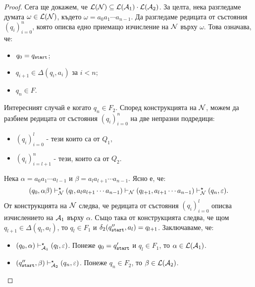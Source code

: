 \begin{proof}
  Сега ще докажем, че $\mathcal{L}(\mathcal{N}) \subseteq \mathcal{L}(\mathcal{A}_1) \cdot \mathcal{L}(\mathcal{A}_2)$.
  За целта, нека разгледаме думата $\omega \in \mathcal{L}(\mathcal{N})$, където $\omega = a_0a_1\cdots a_{n-1}$.
  Да разгледаме редицата от състояния $(q_i)^{n}_{i=0}$, която описва едно приемащо изчисление на $\mathcal{N}$ върху $\omega$.
  Това означава, че:
  \begin{itemize}
  \item
    $q_0 = q_{\texttt{start}}$;
  \item
    $q_{i+1} \in \Delta(q_i,a_i)$ за $i < n$;
  \item
    $q_n \in F$.
  \end{itemize}

  Интересният случай е когато $q_n \in F_2$.
  Според конструкцията на $\mathcal{N}$, можем да разбием редицата от състояния $(q_i)^n_{i=0}$ на две непразни подредици:
  \begin{itemize}
  \item
    $(q_{i})^{l}_{i=0}$ - тези които са от $Q_1$,
  \item
    $(q_i)^{n}_{i=l+1}$ - тези, които са от $Q_2$.
  \end{itemize}
  Нека $\alpha = a_0a_1\cdots a_{l-1}$ и $\beta = a_la_{l+1}\cdots a_{n-1}$.
  Ясно е, че:
  \[(q_0,\alpha\beta) \vdash^\star_{\mathcal{N}} (q_{l}, a_{l}a_{l+1}\cdots a_{n-1}) \vdash_{\mathcal{N}} (q_{l+1},a_{l+1}\cdots a_{n-1}) \vdash^\star_{\mathcal{N}} (q_n,\varepsilon).\]
  От конструкцията на $\mathcal{N}$ следва, че редицата от състояния $(q_i)^{l}_{i=0}$ описва изчислението на $\mathcal{A}_1$ върху $\alpha$.
  Също така от конструкцията следва, че щом $q_{l+1} \in \Delta(q_l,a_l)$, то $q_l \in F_1$ и $\delta_2(q_{\texttt{start}}'',a_l) = q_{l+1}$. Заключаваме, че:
  \begin{itemize}
  \item
    $(q_0, \alpha) \vdash^\star_{\mathcal{A}_1} (q_l,\varepsilon)$.
    Понеже $q_0 = q_{\texttt{start}}'$ и $q_l \in F_1$, то $\alpha \in \mathcal{L}(\mathcal{A}_1)$.
  \item
    $(q_{\texttt{start}}'', \beta) \vdash^\star_{\mathcal{A}_2} (q_n,\varepsilon)$.
    Понеже $q_n \in F_2$, то $\beta \in \mathcal{L}(\mathcal{A}_2)$.
  \end{itemize}
\end{proof}

